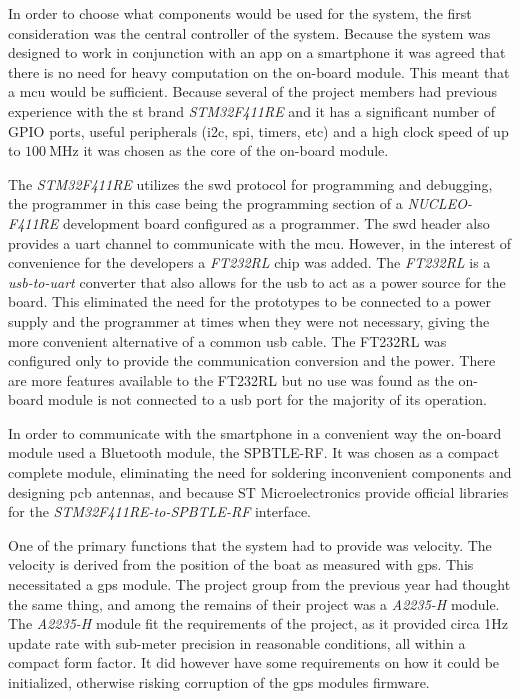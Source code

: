 In order to choose what components would be used for the system, the first consideration was the central controller of the system. Because the system was designed to work in conjunction with an app on a smartphone it was agreed that there is no need for heavy computation on the on-board module. This meant that a \gls{mcu} would be sufficient. Because several of the project members had previous experience with the \gls{st} brand \emph{STM32F411RE} and it has a significant number of GPIO ports, useful peripherals (\gls{i2c}, \gls{spi}, timers, etc) and a high clock speed of up to $100~\textrm{MHz}$ it was chosen as the core of the on-board module. 

The \emph{STM32F411RE} utilizes the \gls{swd} protocol for programming and debugging, the programmer in this case being the programming section of a \emph{NUCLEO-F411RE} development board configured as a programmer. The \gls{swd} header also provides a \gls{uart} channel to communicate with the \gls{mcu}. However, in the interest of convenience for the developers a \emph{FT232RL} chip was added. The \emph{FT232RL} is a \emph{\gls{usb}-to-\gls{uart}} converter that also allows for the \gls{usb} to act as a power source for the board. This eliminated the need for the prototypes to be connected to a power supply and the programmer at times when they were not necessary, giving the more convenient alternative of a common \gls{usb} cable.  The FT232RL was configured only to provide the communication conversion and the power. There are more features available to the FT232RL but no use was found as the on-board module is not connected to a \gls{usb} port for the majority of its operation. 

In order to communicate with the smartphone in a convenient way the on-board module used a Bluetooth module, the SPBTLE-RF. It was chosen as a compact complete module, eliminating the need for soldering inconvenient components and designing \gls{pcb} antennas, and because ST Microelectronics provide official libraries for the \emph{STM32F411RE-to-SPBTLE-RF} interface. 

One of the primary functions that the system had to provide was velocity. The velocity is derived from the position of the boat as measured with \gls{gps}. This necessitated a \gls{gps} module. The project group from the previous year had thought the same thing, and among the remains of their project was a \emph{A2235-H} module. The \emph{A2235-H} module fit the requirements of the project, as it provided circa 1Hz update rate with sub-meter precision in reasonable conditions, all within a compact form factor. It did however have some requirements on how it could be initialized, otherwise risking corruption of the \gls{gps} modules firmware. 

